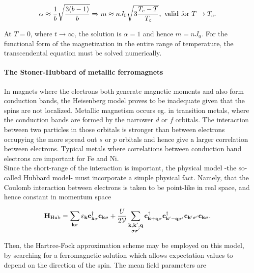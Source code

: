 \documentclass{homework}
\begin{document}
\begin{align}
    \alpha \approx \frac{1}{b} \sqrt{\frac{3(b-1)}{b}} \Rightarrow m \approx nJ_0 \sqrt{3 \frac{T_c - T}{T_c}}, \textnormal{ valid for } T \rightarrow T_c.    
\end{align}


At $T=0$, where $t \rightarrow\infty$, the solution is $\alpha = 1$ and hence $m = n J_0$. For the functional form of the magnetization in the entire range of temperature, the transcendental equation must be solved numerically. \\

\paragraph{\textbf{The Stoner-Hubbard of metallic ferromagnets}}

In magnets where the electrons both generate magnetic moments and also form conduction bands, the Heisenberg model proves to be inadequate given that the spins are not localized. Metallic magnetism occurs eg. in transition metals, where the conduction bands are formed by the narrower $d$ or $f$ orbitals. The interaction between two particles in those orbitals is stronger than between electrons occupying the more spread out $s$ or $p$ orbitals and hence give a larger correlation between electrons. Typical metals where correlations between conduction band electrons are important for Fe and Ni. \\

Since the short-range of the interaction is important, the physical model -the so-called Hubbard model- must incorporate a simple physical fact. Namely, that the Coulomb interaction between electrons is taken to be point-like in real space, and hence constant in momentum space

\begin{equation}
    {\bf H}_{\textnormal{Hub}} = \sum_{{\bf k} \sigma} \varepsilon_{{\bf k}} {\bf c}_{{\bf k}\sigma}^\dagger {\bf c}_{{\bf k}\sigma} + \frac{U}{2\mathcal{V}} \sum_{\substack{{\bf k}, {\bf k}', {\bf q} \\
          {\sigma \sigma'}}} {\bf c}_{{\bf k+q} \sigma}^\dagger {\bf c}_{{\bf k'-q} \sigma'}^\dagger {\bf c}_{{\bf k}' \sigma'} {\bf c}_{{\bf k}\sigma}.
\end{equation}

Then, the Hartree-Fock approximation scheme may be employed on this model, by searching for a ferromagnetic solution which allows expectation values to depend on the direction of the spin. The mean field parameters are 
\end{document}
